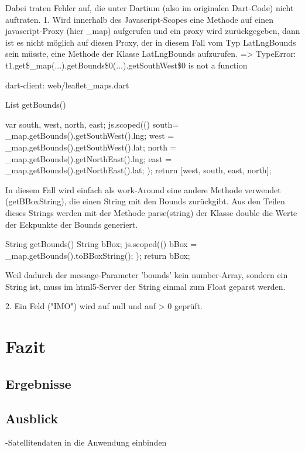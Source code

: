 Dabei traten Fehler auf, die unter Dartium (also im originalen Dart-Code) nicht auftraten.
1. Wird innerhalb des Javascript-Scopes eine Methode auf einen javascript-Proxy (hier \_map) aufgerufen und ein proxy wird zurückgegeben, dann ist es nicht möglich auf diesen Proxy, der in diesem Fall vom Typ LatLngBounds sein müsste, eine Methode der Klasse LatLngBounds aufzurufen. => TypeError: t1.get\$\_map(...).getBounds\$0(...).getSouthWest\$0 is not a function

dart-client: web/leaflet\_maps.dart

  List getBounds(){
    var south, west, north, east;
    js.scoped((){
    south= \_map.getBounds().getSouthWest().lng;
        west = \_map.getBounds().getSouthWest().lat;
        north = \_map.getBounds().getNorthEast().lng;
        east = \_map.getBounds().getNorthEast().lat;
 });
return [west, south, east, north];
    
In diesem Fall wird einfach als work-Around eine andere Methode verwendet (getBBoxString), die einen String mit den Bounds zurückgibt. Aus den Teilen dieses Strings werden mit der Methode parse(string) der Klasse double die Werte der Eckpunkte der Bounds generiert.

String getBounds(){
    String bBox;
    js.scoped((){
      bBox = \_map.getBounds().toBBoxString();
    });
    return bBox;
  }

 Weil dadurch der message-Parameter 'bounds' kein number-Array, sondern ein String ist, muss im html5-Server der String einmal zum Float geparst werden.



2. Ein Feld ("IMO") wird auf null und auf > 0 geprüft.


\chapter{Fazit}\label{c.Fazit}

 \section{Ergebnisse }

\section{Ausblick}
-Satellitendaten in die Anwendung einbinden





}
